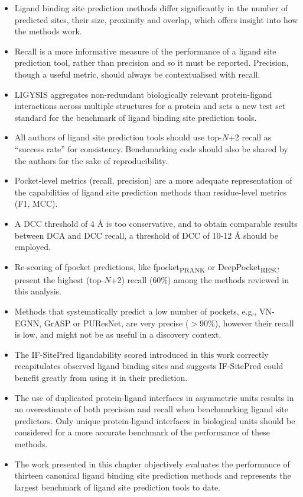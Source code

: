 \begin{itemize}

\item Ligand binding site prediction methods differ significantly in the number of predicted sites, their size, proximity and overlap, which offers insight into how the methods work.

\item Recall is a more informative measure of the performance of a ligand site prediction tool, rather than precision and so it must be reported. Precision, though a useful metric, should always be contextualised with recall.

\item LIGYSIS aggregates non-redundant biologically relevant protein-ligand interactions across multiple structures for a protein and sets a new test set standard for the benchmark of ligand binding site prediction tools. 

\item All authors of ligand site prediction tools should use top-$N$+2 recall as ``success rate'' for consistency. Benchmarking code should also be shared by the authors for the sake of reproducibility.

\item Pocket-level metrics (recall, precision) are a more adequate representation of the capabilities of ligand site prediction methods than residue-level metrics (F1, MCC).

\item A DCC threshold of 4 \AA{} is too conservative, and to obtain comparable results between DCA and DCC recall, a threshold of DCC of 10-12 \AA{} should be employed.

\item Re-scoring of fpocket predictions, like fpocket\textsubscript{PRANK} or DeepPocket\textsubscript{RESC} present the highest (top-$N$+2) recall (60\%) among the methods reviewed in this analysis.

\item Methods that systematically predict a low number of pockets, e.g., VN-EGNN, GrASP or PUResNet, are very precise ($>$90\%), however their recall is low, and might not be as useful in a discovery context.

\item The IF-SitePred ligandability scored introduced in this work correctly recapitulates observed ligand binding sites and suggests IF-SitePred could benefit greatly from using it in their prediction.

\item The use of duplicated protein-ligand interfaces in asymmetric units results in an overestimate of both precision and recall when benchmarking ligand site predictors. Only unique protein-ligand interfaces in biological units should be considered for a more accurate benchmark of the performance of these methods.

\item The work presented in this chapter objectively evaluates the performance of thirteen canonical ligand binding site prediction methods and represents the largest benchmark of ligand site prediction tools to date.

\end{itemize}
